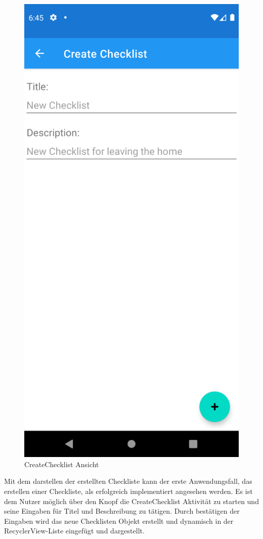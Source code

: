 \begin{figure}[h]
\begin{minipage}{0.45\linewidth}
		\centering
		\includegraphics[width=.9\linewidth]{Bilder/CreateChecklist.png}
		\caption{CreateChecklist Ansicht}
		\label{fig:createChecklist}
	\end{minipage}
\end{figure}

Mit dem darstellen der erstellten Checkliste kann der erste Anwendungsfall, das erstellen einer Checkliste, als erfolgreich implementiert angesehen werden. Es ist dem Nutzer möglich über den Knopf die CreateChecklist Aktivität zu starten und seine Eingaben für Titel und Beschreibung zu tätigen. Durch bestätigen der Eingaben wird das neue Checklisten Objekt erstellt und dynamisch in der RecyclerView-Liste eingefügt und dargestellt.

